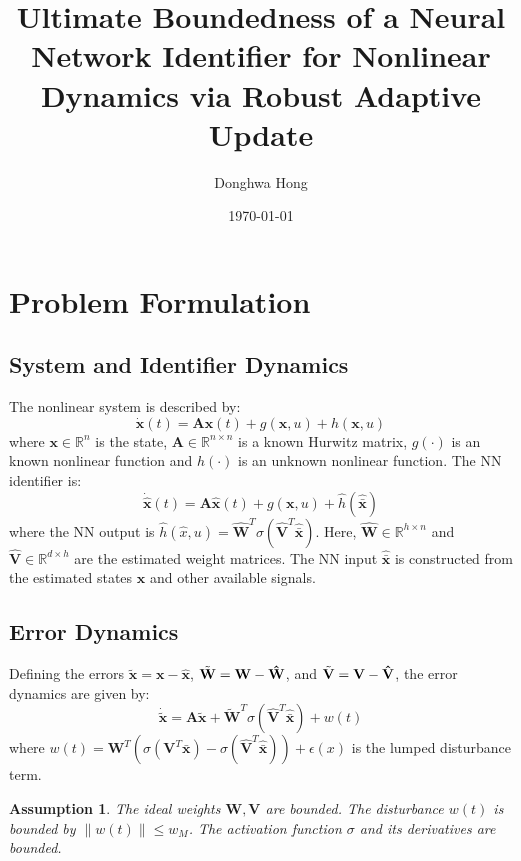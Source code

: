 \documentclass[11pt, a4paper]{article}
\title{Ultimate Boundedness of a Neural Network Identifier for Nonlinear Dynamics via Robust Adaptive Update}
\author{Donghwa Hong}
\date{\today}
\newtheorem{assumption}{Assumption}
\newcommand{\R}{\mathbb{R}}
\newcommand{\xtilde}{\tilde{\bm{x}}}
\newcommand{\xhat}{\hat{\bm{x}}}
\newcommand{\xbar}{\bar{\bm{x}}}
\newcommand{\xhatbar}{\hat{\bar{\bm{x}}}}
\newcommand{\Wtilde}{\tilde{\mathbf{W}}}
\newcommand{\What}{\hat{\mathbf{W}}}
\newcommand{\Vtilde}{\tilde{\mathbf{V}}}
\newcommand{\Vhat}{\hat{\mathbf{V}}}
\begin{document}
\maketitle

\section{Problem Formulation}

\subsection{System and Identifier Dynamics}
The nonlinear system is described by:
\begin{equation}
    \dot{\bm{x}}(t) = \mathbf{A}\bm{x}(t) + g(\bm{x}, u) + h(\bm{x}, u)
    \label{eq:system}
\end{equation}
where $\bm{x} \in \R^n$ is the state, $\mathbf{A} \in \R^{n \times n}$ is a known Hurwitz matrix, $g(\cdot)$ is an known nonlinear function and $h(\cdot)$ is an unknown nonlinear function. The NN identifier is:
\begin{equation}
    \dot{\xhat}(t) = \mathbf{A}\xhat(t) + g(\bm{x}, u) + \hat{h}(\xhatbar)
    \label{eq:identifier}
\end{equation}
where the NN output is $\hat{h}(\hat{x},u) = \What^T \sigma(\Vhat^T \xhatbar)$. Here, $\What \in \R^{h \times n}$ and $\Vhat \in \R^{d \times h}$ are the estimated weight matrices. The NN input $\xhatbar$ is constructed from the estimated states $\xhat$ and other available signals.

\subsection{Error Dynamics}
Defining the errors $\xtilde = \bm{x} - \xhat$, $\Wtilde = \bf{W} - \What$, and $\Vtilde = \bf{V} - \Vhat$, the error dynamics are given by:
\begin{equation}
    \dot{\xtilde} = \mathbf{A}\xtilde + \Wtilde^T \sigma(\Vhat^T \xhatbar) + w(t)
    \label{eq:error_dyn_final}
\end{equation}
where $w(t) = {\mathbf{W}}^T(\sigma(\mathbf{V}^T\xbar) - \sigma(\Vhat^T\xhatbar)) + \epsilon(x)$ is the lumped disturbance term.

\begin{assumption}
The ideal weights $\mathbf{W}, \mathbf{V}$ are bounded. The disturbance $w(t)$ is bounded by $\|w(t)\| \le w_M$. The activation function $\sigma$ and its derivatives are bounded.
\end{assumption}
\end{document}
